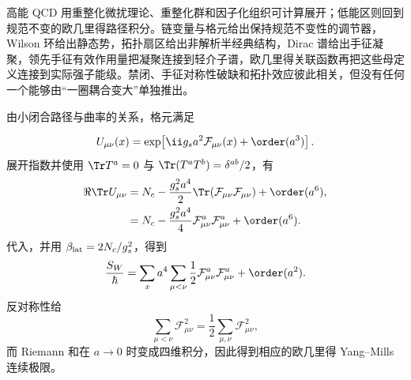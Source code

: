 高能 QCD 用重整化微扰理论、重整化群和因子化组织可计算展开；低能区则回到规范不变的欧几里得路径积分。链变量与格元给出保持规范不变性的调节器，Wilson 环给出静态势，拓扑扇区给出非解析半经典结构，Dirac 谱给出手征凝聚，领先手征有效作用量把凝聚连接到轻介子谱，欧几里得关联函数再把这些母定义连接到实际强子能级。禁闭、手征对称性破缺和拓扑效应彼此相关，但没有任何一个能够由“一圈耦合变大”单独推出。


\begin{derivation}
由小闭合路径与曲率的关系，格元满足

\begin{equation*}
 U_{\mu\nu}(x)
 =\exp\!\left[\ii g_sa^2\mathcal F_{\mu\nu}(x)+\order(a^3)\right].
\end{equation*}
展开指数并使用 $\Tr T^a=0$ 与 $\Tr(T^aT^b)=\delta^{ab}/2$，有
\begin{align*}
 \Re\Tr U_{\mu\nu}
 &=N_c-
 \frac{g_s^2a^4}{2}
 \Tr\!\left(\mathcal F_{\mu\nu}\mathcal F_{\mu\nu}\right)
 +\order(a^6),\\
 &=N_c-
 \frac{g_s^2a^4}{4}
 \mathcal F_{\mu\nu}^a\mathcal F_{\mu\nu}^a
 +\order(a^6).
\end{align*}
代入，并用 $\beta_{\rm lat}=2N_c/g_s^2$，得到
\begin{equation*}
 \frac{S_W}{\hbar}
 =\sum_xa^4\sum_{\mu<\nu}
 \frac12\mathcal F_{\mu\nu}^a\mathcal F_{\mu\nu}^a
 +\order(a^2).
\end{equation*}
反对称性给
\begin{equation*}
 \sum_{\mu<\nu}\mathcal F_{\mu\nu}^2
 =\frac12\sum_{\mu,\nu}\mathcal F_{\mu\nu}^2,
\end{equation*}
而 Riemann 和在 $a\to0$ 时变成四维积分，因此得到相应的欧几里得 Yang--Mills 连续极限。
\end{derivation}



